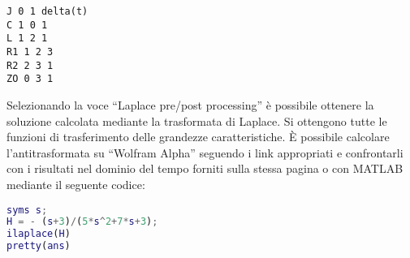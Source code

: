 \begin{lstlisting}[frame = single]
J 0 1 delta(t)
C 1 0 1
L 1 2 1
R1 1 2 3
R2 2 3 1
ZO 0 3 1
\end{lstlisting}
Selezionando la voce ``Laplace pre/post processing'' è possibile ottenere
la soluzione calcolata mediante la trasformata di Laplace.
Si ottengono tutte le funzioni di trasferimento delle grandezze caratteristiche.
È possibile calcolare l'antitrasformata su ``Wolfram Alpha'' seguendo
i link appropriati e confrontarli con i risultati nel dominio del tempo
forniti sulla stessa pagina o con MATLAB mediante il seguente codice:
\begin{lstlisting}[style=Matlab-editor,language = Matlab]
syms s;
H = - (s+3)/(5*s^2+7*s+3);
ilaplace(H)
pretty(ans)
\end{lstlisting}


